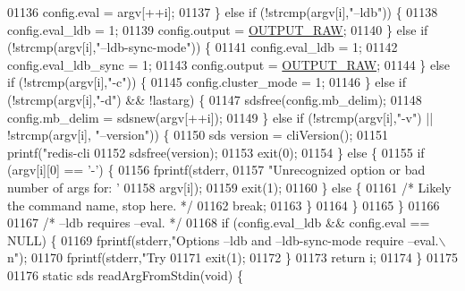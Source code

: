 \begin{DoxyCode}
{{{{{{{{{{{{{{{{{{{{{{{{{{{{{01136             config.eval = argv[++i];
01137         \} \textcolor{keywordflow}{else} \textcolor{keywordflow}{if} (!strcmp(argv[i],\textcolor{stringliteral}{"--ldb"})) \{
01138             config.eval\_ldb = 1;
01139             config.output = \hyperlink{redis-cli_8c_a4f47017b54da140967dcbd440fae227c}{OUTPUT\_RAW};
01140         \} \textcolor{keywordflow}{else} \textcolor{keywordflow}{if} (!strcmp(argv[i],\textcolor{stringliteral}{"--ldb-sync-mode"})) \{
01141             config.eval\_ldb = 1;
01142             config.eval\_ldb\_sync = 1;
01143             config.output = \hyperlink{redis-cli_8c_a4f47017b54da140967dcbd440fae227c}{OUTPUT\_RAW};
01144         \} \textcolor{keywordflow}{else} \textcolor{keywordflow}{if} (!strcmp(argv[i],\textcolor{stringliteral}{"-c"})) \{
01145             config.cluster\_mode = 1;
01146         \} \textcolor{keywordflow}{else} \textcolor{keywordflow}{if} (!strcmp(argv[i],\textcolor{stringliteral}{"-d"}) && !lastarg) \{
01147             sdsfree(config.mb\_delim);
01148             config.mb\_delim = sdsnew(argv[++i]);
01149         \} \textcolor{keywordflow}{else} \textcolor{keywordflow}{if} (!strcmp(argv[i],\textcolor{stringliteral}{"-v"}) || !strcmp(argv[i], \textcolor{stringliteral}{"--version"})) \{
01150             sds version = cliVersion();
01151             printf(\textcolor{stringliteral}{"redis-cli %
01152             sdsfree(version);
01153             exit(0);
01154         \} \textcolor{keywordflow}{else} \{
01155             \textcolor{keywordflow}{if} (argv[i][0] == \textcolor{stringliteral}{'-'}) \{
01156                 fprintf(stderr,
01157                     \textcolor{stringliteral}{"Unrecognized option or bad number of args for: '%
01158                     argv[i]);
01159                 exit(1);
01160             \} \textcolor{keywordflow}{else} \{
01161                 \textcolor{comment}{/* Likely the command name, stop here. */}
01162                 \textcolor{keywordflow}{break};
01163             \}
01164         \}
01165     \}
01166 
01167     \textcolor{comment}{/* --ldb requires --eval. */}
01168     \textcolor{keywordflow}{if} (config.eval\_ldb && config.eval == NULL) \{
01169         fprintf(stderr,\textcolor{stringliteral}{"Options --ldb and --ldb-sync-mode require --eval.\(\backslash\)n"});
01170         fprintf(stderr,\textcolor{stringliteral}{"Try %
01171         exit(1);
01172     \}
01173     \textcolor{keywordflow}{return} i;
01174 \}
01175 
01176 \textcolor{keyword}{static} sds readArgFromStdin(\textcolor{keywordtype}{void}) \{
}}}}}}}}}}}}}}}}}}}}}}}}}}}}}}}}
\end{DoxyCode}
